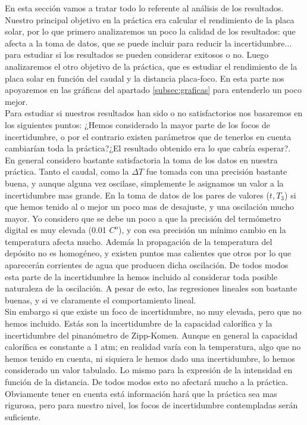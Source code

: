 \documentclass[12pt,a4paper]{article}
\begin{document}
En esta sección vamos a tratar todo lo referente al análisis de los resultados. \\

Nuestro principal objetivo en la práctica era calcular el rendimiento de la placa solar, por lo que primero analizaremos un poco la calidad de los resultados: que afecta a la toma de datos, que se puede incluir para reducir la incertidumbre... para estudiar si los resultados se pueden considerar exitosos o no. Luego analizaremos el otro objetivo de la práctica, que es estudiar el rendimiento de la placa solar en función del caudal y la distancia placa-foco. En esta parte nos apoyaremos en las gráficas del apartado \ref{subsec:graficas} para entenderlo un poco mejor. \\

Para estudiar si nuestros resultados han sido o no satisfactorios nos basaremos en los siguientes puntos: ¿Hemos considerado la mayor parte de los focos de incertidumbre, o por el contrario existen parámetros que de tenerlos en cuenta cambiarían toda la práctica?¿El resultado obtenido era lo que cabría esperar?. \\

En general considero bastante satisfactoria la toma de los datos en nuestra práctica. Tanto el caudal, como la $\Delta T$ fue tomada con una precisión bastante buena, y aunque alguna vez oscilase, simplemente le asignamos un valor a la incertidumbre mas grande. En la toma de datos de los pares de valores ($t,T_3$) si que hemos tenido al o mejor un poco mas de desajuste, y una oscilación mucho mayor. Yo considero que se debe un poco a que la precisión del termómetro digital es muy elevada (0.01 $C^o$), y con esa precisión un mínimo cambio en la temperatura afecta mucho. Además la propagación de la temperatura del depósito no es homogéneo, y existen puntos mas calientes que otros por lo que aparecerán corrientes de agua que producen dicha oscilación. De todos modos esta parte de la incertidumbre la hemos incluido al considerar toda posible naturaleza de la oscilación. A pesar de esto, las regresiones lineales son bastante buenas, y si ve claramente el comportamiento lineal. \\

Sin embargo si que existe un foco de incertidumbre, no muy elevada, pero que no hemos incluido. Estás son la incertidumbre de la capacidad calorífica y la incertidumbre del pinanómetro de Zipp-Komen. Aunque en general la capacidad calorífica es constante a 1 atm; en realidad varía con la temperatura, algo que no hemos tenido en cuenta, ni siquiera le hemos dado una incertidumbre, lo hemos considerado un valor tabulado. Lo mismo para la expresión de la intensidad en función de la distancia. De todos modos esto no afectará mucho a la práctica. Obviamente tener en cuenta está información hará que la práctica sea mas rigurosa, pero para nuestro nivel, los focos de incertidumbre contempladas serán suficiente. \\
\end{document}
